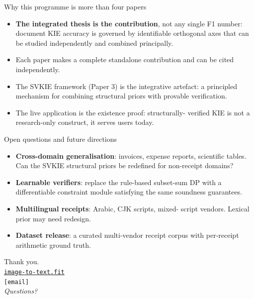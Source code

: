 \documentclass{beamer}
\begin{document}
\begin{frame}{Why this programme is more than four papers}
  \begin{itemize}
    \item \textbf{The integrated thesis is the contribution}, not any
          single F1 number: document KIE accuracy is governed by
          identifiable orthogonal axes that can be studied independently
          and combined principally.
    \item Each paper makes a complete standalone contribution and
          can be cited independently.
    \item The SVKIE framework (Paper 3) is the integrative artefact:
          a principled mechanism for combining structural priors with
          provable verification.
    \item The live application is the existence proof: structurally-
          verified KIE is not a research-only construct, it serves
          users today.
  \end{itemize}
\end{frame}

\begin{frame}{Open questions and future directions}
  \begin{itemize}
    \item \textbf{Cross-domain generalisation}: invoices, expense
          reports, scientific tables.  Can the SVKIE structural priors
          be redefined for non-receipt domains?
    \item \textbf{Learnable verifiers}: replace the rule-based
          subset-sum DP with a differentiable constraint module
          satisfying the same soundness guarantees.
    \item \textbf{Multilingual receipts}: Arabic, CJK scripts, mixed-
          script vendors.  Lexical prior may need redesign.
    \item \textbf{Dataset release}: a curated multi-vendor receipt
          corpus with per-receipt arithmetic ground truth.
  \end{itemize}
\end{frame}

\begin{frame}
  \begin{center}
    \LARGE Thank you.\\[1em]
    \normalsize
    \href{https://image-to-text.fit/}{\texttt{image-to-text.fit}}\\
    \texttt{[email]}\\[1em]
    \emph{Questions?}
  \end{center}
\end{frame}
\end{document}
